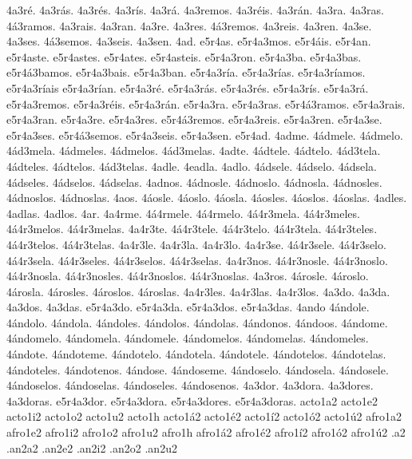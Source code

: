 {4a3r^^e9. 4a3r^^e1s. 4a3r^^e9s. 4a3r^^eds. 4a3r^^e1. 4a3remos. 4a3r^^e9is. 4a3r^^e1n.
4a3ra. 4a3ras. 4^^e13ramos. 4a3rais. 4a3ran.
4a3re. 4a3res. 4^^e13remos. 4a3reis. 4a3ren.
4a3se. 4a3ses. 4^^e13semos. 4a3seis. 4a3sen.
4ad.
e5r4as. e5r4a3mos. e5r4^^e1is. e5r4an.
e5r4aste. e5r4astes. e5r4ates. e5r4asteis. e5r4a3ron.
e5r4a3ba. e5r4a3bas. e5r4^^e13bamos. e5r4a3bais. e5r4a3ban.
e5r4a3r^^eda. e5r4a3r^^edas. e5r4a3r^^edamos. e5r4a3r^^edais e5r4a3r^^edan.
e5r4a3r^^e9. e5r4a3r^^e1s. e5r4a3r^^e9s. e5r4a3r^^eds. e5r4a3r^^e1. e5r4a3remos. e5r4a3r^^e9is. e5r4a3r^^e1n.
e5r4a3ra. e5r4a3ras. e5r4^^e13ramos. e5r4a3rais. e5r4a3ran.
e5r4a3re. e5r4a3res. e5r4^^e13remos. e5r4a3reis. e5r4a3ren.
e5r4a3se. e5r4a3ses. e5r4^^e13semos. e5r4a3seis. e5r4a3sen.
e5r4ad.
4adme.
4^^e1dmele. 4^^e1dmelo. 4^^e1d3mela.
4^^e1dmeles. 4^^e1dmelos. 4^^e1d3melas.
4adte.
4^^e1dtele. 4^^e1dtelo. 4^^e1d3tela.
4^^e1dteles. 4^^e1dtelos. 4^^e1d3telas.
4adle. 4eadla. 4adlo.
4^^e1dsele. 4^^e1dselo. 4^^e1dsela.
4^^e1dseles. 4^^e1dselos. 4^^e1dselas.
4adnos.
4^^e1dnosle. 4^^e1dnoslo. 4^^e1dnosla.
4^^e1dnosles. 4^^e1dnoslos. 4^^e1dnoslas.
4aos.
4^^e1osle. 4^^e1oslo. 4^^e1osla.
4^^e1osles. 4^^e1oslos. 4^^e1oslas.
4adles. 4adlas. 4adlos.
4ar.
4a4rme.
4^^e14rmele. 4^^e14rmelo. 4^^e14r3mela.
4^^e14r3meles. 4^^e14r3melos. 4^^e14r3melas.
4a4r3te.
4^^e14r3tele. 4^^e14r3telo. 4^^e14r3tela.
4^^e14r3teles. 4^^e14r3telos. 4^^e14r3telas.
4a4r3le. 4a4r3la. 4a4r3lo.
4a4r3se.
4^^e14r3sele. 4^^e14r3selo. 4^^e14r3sela.
4^^e14r3seles. 4^^e14r3selos. 4^^e14r3selas.
4a4r3nos.
4^^e14r3nosle. 4^^e14r3noslo. 4^^e14r3nosla.
4^^e14r3nosles. 4^^e14r3noslos. 4^^e14r3noslas.
4a3ros.
4^^e1rosle. 4^^e1roslo. 4^^e1rosla.
4^^e1rosles. 4^^e1roslos. 4^^e1roslas.
4a4r3les. 4a4r3las. 4a4r3los.
4a3do. 4a3da. 4a3dos. 4a3das.
e5r4a3do. e5r4a3da. e5r4a3dos. e5r4a3das.
4ando
4^^e1ndole. 4^^e1ndolo. 4^^e1ndola. 4^^e1ndoles. 4^^e1ndolos. 4^^e1ndolas.
4^^e1ndonos. 4^^e1ndoos.
4^^e1ndome. 4^^e1ndomelo. 4^^e1ndomela. 4^^e1ndomele.
4^^e1ndomelos. 4^^e1ndomelas. 4^^e1ndomeles.
4^^e1ndote. 4^^e1ndoteme.
4^^e1ndotelo. 4^^e1ndotela. 4^^e1ndotele.
4^^e1ndotelos. 4^^e1ndotelas. 4^^e1ndoteles.
4^^e1ndotenos.
4^^e1ndose. 4^^e1ndoseme.
4^^e1ndoselo. 4^^e1ndosela. 4^^e1ndosele.
4^^e1ndoselos. 4^^e1ndoselas. 4^^e1ndoseles.
4^^e1ndosenos.
4a3dor. 4a3dora. 4a3dores. 4a3doras.
e5r4a3dor. e5r4a3dora. e5r4a3dores. e5r4a3doras.
acto1a2 acto1e2 acto1i2 acto1o2 acto1u2 acto1h
acto1^^e12 acto1^^e92 acto1^^ed2 acto1^^f32 acto1^^fa2
afro1a2 afro1e2 afro1i2 afro1o2 afro1u2 afro1h
afro1^^e12 afro1^^e92 afro1^^ed2 afro1^^f32 afro1^^fa2
.a2 .an2a2 .an2e2 .an2i2 .an2o2 .an2u2
}
